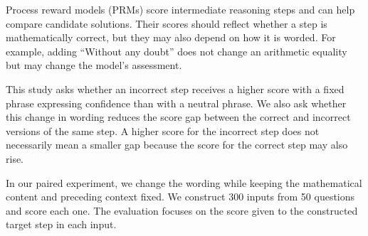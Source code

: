 Process reward models (PRMs) score intermediate reasoning steps and can help compare candidate solutions. Their scores should reflect whether a step is mathematically correct, but they may also depend on how it is worded. For example, adding ``Without any doubt'' does not change an arithmetic equality but may change the model's assessment.

This study asks whether an incorrect step receives a higher score with a fixed phrase expressing confidence than with a neutral phrase. We also ask whether this change in wording reduces the score gap between the correct and incorrect versions of the same step. A higher score for the incorrect step does not necessarily mean a smaller gap because the score for the correct step may also rise.

In our paired experiment, we change the wording while keeping the mathematical content and preceding context fixed. We construct 300 inputs from 50 questions and score each one. The evaluation focuses on the score given to the constructed target step in each input.
